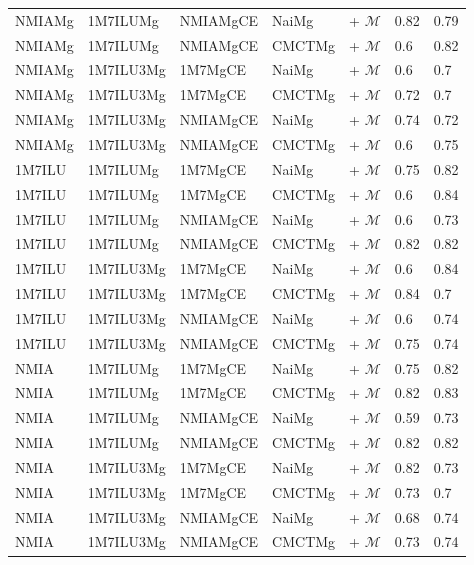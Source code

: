 \documentclass[a4,center,fleqn]{NAR}
\begin{document}
\begin{itemize}
\begin{table}[h]
\begin{adjustbox}{max width=\linewidth}
\begin{tabular}{@{}lllllHH@{}}
				NMIAMg	&	1M7ILUMg	&	NMIAMgCE	&	NaiMg	&	+ $\mathcal{M}$	&	0.82	&	0.79	\\
NMIAMg	&	1M7ILUMg	&	NMIAMgCE	&	CMCTMg	&	+ $\mathcal{M}$	&	0.6	&	0.82	\\
NMIAMg	&	1M7ILU3Mg	&	1M7MgCE	&	NaiMg	&	+ $\mathcal{M}$	&	0.6	&	0.7	\\
NMIAMg	&	1M7ILU3Mg	&	1M7MgCE	&	CMCTMg	&	+ $\mathcal{M}$	&	0.72	&	0.7	\\
NMIAMg	&	1M7ILU3Mg	&	NMIAMgCE	&	NaiMg	&	+ $\mathcal{M}$	&	0.74	&	0.72	\\
NMIAMg	&	1M7ILU3Mg	&	NMIAMgCE	&	CMCTMg	&	+ $\mathcal{M}$	&	0.6	&	0.75	\\
1M7ILU	&	1M7ILUMg	&	1M7MgCE	&	NaiMg	&	+ $\mathcal{M}$	&	0.75	&	0.82	\\
1M7ILU	&	1M7ILUMg	&	1M7MgCE	&	CMCTMg	&	+ $\mathcal{M}$	&	0.6	&	0.84	\\
1M7ILU	&	1M7ILUMg	&	NMIAMgCE	&	NaiMg	&	+ $\mathcal{M}$	&	0.6	&	0.73	\\
1M7ILU	&	1M7ILUMg	&	NMIAMgCE	&	CMCTMg	&	+ $\mathcal{M}$	&	0.82	&	0.82	\\
1M7ILU	&	1M7ILU3Mg	&	1M7MgCE	&	NaiMg	&	+ $\mathcal{M}$	&	0.6	&	0.84	\\
1M7ILU	&	1M7ILU3Mg	&	1M7MgCE	&	CMCTMg	&	+ $\mathcal{M}$	&	0.84	&	0.7	\\
1M7ILU	&	1M7ILU3Mg	&	NMIAMgCE	&	NaiMg	&	+ $\mathcal{M}$	&	0.6	&	0.74	\\
1M7ILU	&	1M7ILU3Mg	&	NMIAMgCE	&	CMCTMg	&	+ $\mathcal{M}$	&	0.75	&	0.74	\\
NMIA	&	1M7ILUMg	&	1M7MgCE	&	NaiMg	&	+ $\mathcal{M}$	&	0.75	&	0.82	\\
NMIA	&	1M7ILUMg	&	1M7MgCE	&	CMCTMg	&	+ $\mathcal{M}$	&	0.82	&	0.83	\\
NMIA	&	1M7ILUMg	&	NMIAMgCE	&	NaiMg	&	+ $\mathcal{M}$	&	0.59	&	0.73	\\
NMIA	&	1M7ILUMg	&	NMIAMgCE	&	CMCTMg	&	+ $\mathcal{M}$	&	0.82	&	0.82	\\
NMIA	&	1M7ILU3Mg	&	1M7MgCE	&	NaiMg	&	+ $\mathcal{M}$	&	0.82	&	0.73	\\
NMIA	&	1M7ILU3Mg	&	1M7MgCE	&	CMCTMg	&	+ $\mathcal{M}$	&	0.73	&	0.7	\\
NMIA	&	1M7ILU3Mg	&	NMIAMgCE	&	NaiMg	&	+ $\mathcal{M}$	&	0.68	&	0.74	\\
NMIA	&	1M7ILU3Mg	&	NMIAMgCE	&	CMCTMg	&	+ $\mathcal{M}$	&	0.73	&	0.74	\\
	

\end{tabular}
\end{adjustbox}
\end{table}
\end{itemize}
\end{document}
